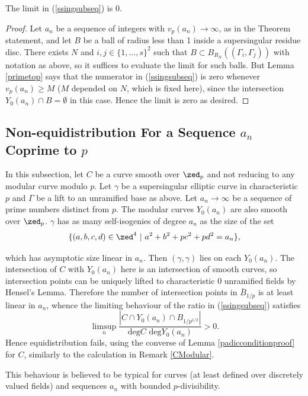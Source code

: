 \documentclass[12pt,letterpaper]{article}
\begin{document}
	
	\begin{thm}\label{ThmSsing}
		The limit in (\ref{ssingsubseq}) is 0.
	\end{thm}
	
	\begin{proof}
		Let $a_n$ be a sequence of integers with $v_p(a_n)\to \infty$, as in the Theorem statement, and let $B$ be a ball of radius less than 1 inside a supersingular residue disc. There exists $N$ and $i,j\in \{1,...,s\}^2$ such that $B\subset B_{R_N}((\Gamma_i,\Gamma_j))$ with notation as above, so it suffices to evaluate the limit for such balls. But Lemma \ref{primetop} says that the numerator in (\ref{ssingsubseq}) is zero whenever $v_p(a_n)\geq M$ ($M$ depended on $N$, which is fixed here), since the intersection $Y_0(a_n)\cap B=\emptyset$ in this case. Hence the limit is zero as desired. 
	\end{proof}
	
	
	\subsection{Non-equidistribution For a Sequence $a_n$ Coprime to $p$}
	
	In this subsection, let $C$ be a curve smooth over $\zed_p$ and not reducing to any modular curve modulo $p$. Let $\gamma$ be a supersingular elliptic curve in characteristic $p$ and $\Gamma$ be a lift to an unramified base as above. Let $a_n\to \infty$ be a sequence of prime numbers distinct from $p$. The modular curves $Y_0(a_n)$ are also smooth over $\zed_p$. $\gamma$ has as many self-isogenies of degree $a_n$ as the size of the set
	\[\{(a,b,c,d)\in \zed^4 \ | \ a^2+b^2+pc^2+pd^2=a_n\},\]
	
	which has asymptotic size linear in $a_n$. Then $(\gamma,\gamma)$ lies on each $Y_0(a_n)$. The intersection of $C$ with $Y_0(a_n)$ here is an intersection of smooth curves, so intersection points can be uniquely lifted to characteristic 0 unramified fields by Hensel's Lemma. Therefore the number of intersection points in $\bar{B}_{1/p}$ is at least linear in $a_n$, whence the limiting behaviour of the ratio in (\ref{ssingsubseq}) satisfies
	\[\limsup_n \frac{|C\cap Y_0(a_n)\cap B_{1/p^{1/2}}|}{\text{deg}{C}\text{ deg}Y_0(a_n)}>0.\] Hence equidistribution fails, using the converse of Lemma \ref{padicconditionproof} for $C$, similarly to the calculation in Remark \ref{CModular}.
	
	
	This behaviour is believed to be typical for curves (at least defined over discretely valued fields) and sequences $a_n$ with bounded $p$-divisibility.
	
\end{document}
